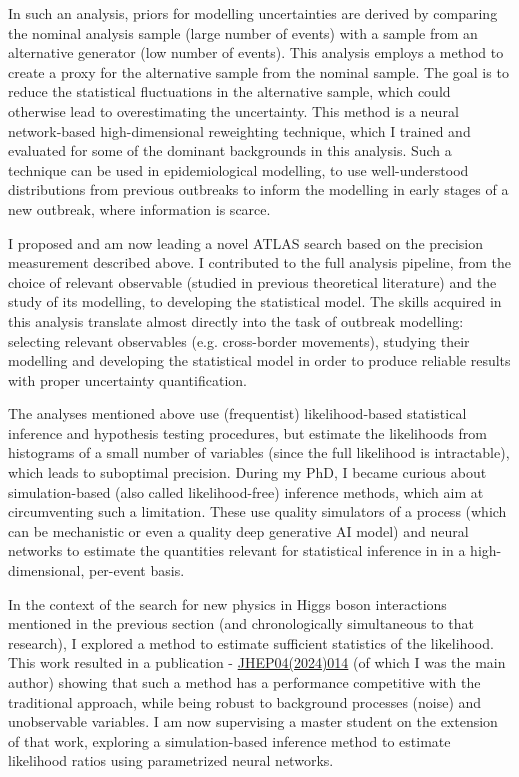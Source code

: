 \documentclass[11pt, a4paper]{awesome-cv}
\begin{document}
\begin{cvletter}
In such an analysis, priors for modelling uncertainties are derived by comparing the nominal analysis sample (large number of events) with a sample from an alternative generator (low number of events). This analysis employs a method to create a proxy for the alternative sample from the nominal sample. The goal is to reduce the statistical fluctuations in the alternative sample, which could otherwise lead to overestimating the uncertainty. This method is a neural network-based high-dimensional reweighting technique, which I trained and evaluated for some of the dominant backgrounds in this analysis. Such a technique can be used in epidemiological modelling, to use well-understood distributions from previous outbreaks to inform the modelling in early stages of a new outbreak, where information is scarce.

I proposed and am now leading a novel ATLAS search based on the precision measurement described above. I contributed to the full analysis pipeline, from the choice of relevant observable (studied in previous theoretical literature) and the study of its modelling, to developing the statistical model. The skills acquired in this analysis translate almost directly into the task of outbreak modelling: selecting relevant observables (e.g. cross-border movements), studying their modelling and developing the statistical model in order to produce reliable results with proper uncertainty quantification.


The analyses mentioned above use (frequentist) likelihood-based statistical inference and hypothesis testing procedures, but estimate the likelihoods from histograms of a small number of variables (since the full likelihood is intractable), which leads to suboptimal precision. During my PhD, I became curious about simulation-based (also called likelihood-free) inference methods, which aim at circumventing such a limitation. These use quality simulators of a process (which can be mechanistic or even a quality deep generative AI model) and neural networks to estimate the quantities relevant for statistical inference in in a high-dimensional, per-event basis.

In the context of the search for new physics in Higgs boson interactions mentioned in the previous section (and chronologically simultaneous to that research), I explored a method to estimate sufficient statistics of the likelihood. This work resulted in a publication - \href{http://dx.doi.org/10.1007/JHEP04(2024)014}{JHEP04(2024)014} (of which I was the main author) showing that such a method has a performance competitive with the traditional approach, while being robust to background processes (noise) and unobservable variables. I am now supervising a master student on the extension of that work, exploring a simulation-based inference method to estimate likelihood ratios using parametrized neural networks. %


\end{cvletter}
\end{document}
